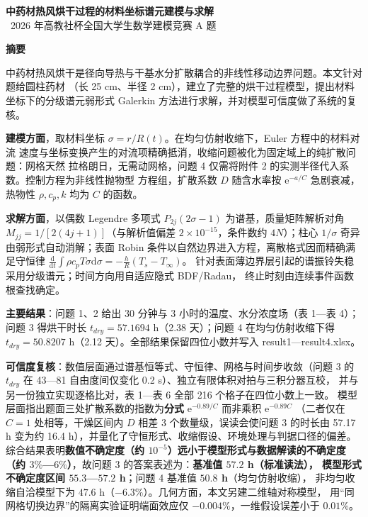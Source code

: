 \documentclass[12pt,a4paper]{ctexart}
\newcommand{\ud}{\mathrm{d}}
\newcommand{\dd}{\mathrm{d}}
\newcommand{\ee}{\mathrm{e}}
\begin{document}
\begin{center}
  {\bfseries 中药材热风烘干过程的材料坐标谱元建模与求解}\\[6pt]
  {\ 2026 年高教社杯全国大学生数学建模竞赛 A 题}
\end{center}
\vspace{4pt}

\begin{center}
{\bfseries 摘\quad 要}
\end{center}

\noindent
中药材热风烘干是径向导热与干基水分扩散耦合的非线性移动边界问题。本文针对题给圆柱药材
（长 25 cm、半径 2 cm），建立了完整的烘干过程模型，提出材料坐标下的分级谱元弱形式
Galerkin 方法进行求解，并对模型可信度做了系统的复核。

\textbf{建模方面}，取材料坐标 $\sigma=r/R(t)$。在均匀仿射收缩下，Euler 方程中的材料对流
速度与坐标变换产生的对流项精确抵消，收缩问题被化为固定域上的纯扩散问题：网格天然
拉格朗日，无需动网格，问题 4 仅需将附件 2 的实测半径代入系数。控制方程为非线性抛物型
方程组，扩散系数 $D$ 随含水率按 $\ee^{-a/C}$ 急剧衰减，热物性 $\rho,c_p,k$ 均为 $C$ 的函数。

\textbf{求解方面}，以偶数 Legendre 多项式 $P_{2j}(2\sigma-1)$ 为谱基，质量矩阵解析对角
$M_{jj}=1/[2(4j+1)]$（与解析值偏差 $2\times10^{-15}$，条件数约 $4N$）；柱心 $1/\sigma$
奇异由弱形式自动消解；表面 Robin 条件以自然边界进入方程，离散格式因而精确满足守恒律
$\frac{\dd}{\dd t}\int\rho c_pT\sigma\ud\sigma=-\frac{h}{R}(T_s-T_\infty)$。
针对表面薄边界层引起的谱振铃失稳采用分级谱元；时间方向用自适应隐式 BDF/Radau，
终止时刻由连续事件函数根查找确定。

\textbf{主要结果}：问题 1、2 给出 30 分钟与 3 小时的温度、水分浓度场（表 1—表 4）；
问题 3 得烘干时长 $t_{dry}=57.1694$ h（2.38 天）；问题 4 在均匀仿射收缩下得
$t_{dry}=50.8207$ h（2.12 天）。全部结果保留四位小数并写入 result1—result4.xlsx。

\textbf{可信度复核}：数值层面通过谱基恒等式、守恒律、网格与时间步收敛（问题 3 的
$t_{dry}$ 在 43—81 自由度间仅变化 0.2 s）、独立有限体积对拍与三积分器互校，
并与另一份独立实现逐格比对，表 1—表 6 全部 216 个格子在四位小数上一致。
模型层面指出题面三处扩散系数的指数为\textbf{分式} $\ee^{-0.89/C}$ 而非乘积 $\ee^{-0.89C}$
（二者仅在 $C=1$ 处相等，干燥区间内 $D$ 相差 3 个数量级，误读会使问题 3 的时长由
57.17 h 变为约 16.4 h），并量化了守恒形式、收缩假设、环境处理与判据口径的偏差。
综合结果表明\textbf{数值不确定度（约 $10^{-5}$）远小于模型形式与数据解读的不确定度
（约 $3\%$—$6\%$）}，故问题 3 的答案表述为：\textbf{基准值 $57.2$ h（标准读法），
模型形式不确定度区间 $55.3$—$57.2$ h}；问题 4 基准值 \textbf{$50.8$ h}（均匀仿射收缩），
非均匀收缩自洽模型下为 $47.6$ h（$-6.3\%$）。几何方面，本文另建二维轴对称模型，
用“同网格切换边界”的隔离实验证明端面效应仅 $-0.004\%$，一维假设误差小于 $0.01\%$。
\end{document}
